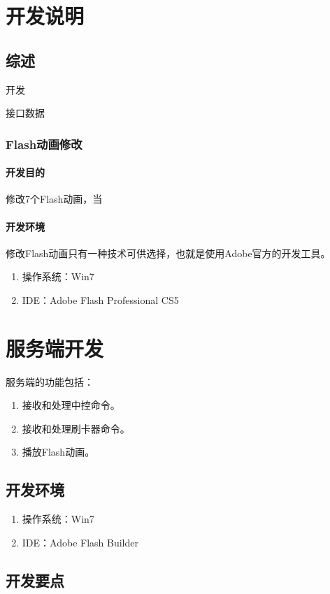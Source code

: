 \chapter{开发说明}

\section{综述}
开发

接口数据

\subsection{Flash动画修改}
\subsubsection{开发目的}
修改7个Flash动画，当

\subsubsection{开发环境}
修改Flash动画只有一种技术可供选择，也就是使用Adobe官方的开发工具。

\begin{enumerate}
\item 操作系统：Win7
\item IDE：Adobe Flash Professional CS5
\end{enumerate}

\chapter{服务端开发}
服务端的功能包括：
\begin{enumerate}
\item 接收和处理中控命令。
\item 接收和处理刷卡器命令。
\item 播放Flash动画。
\end{enumerate}

\section{开发环境}
\begin{enumerate}
\item 操作系统：Win7
\item IDE：Adobe Flash Builder
\end{enumerate}

\section{开发要点}
